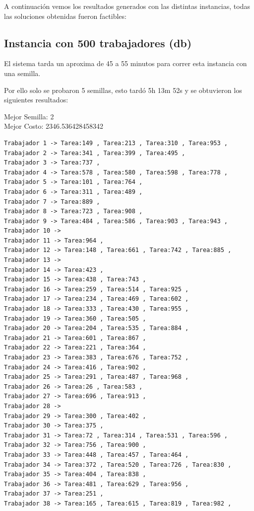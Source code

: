 \documentclass{article}
\begin{document}
A continuación vemos los resultados generados con las distintas instancias, todas las soluciones obtenidas fueron factibles:

\subsection{Instancia con 500 trabajadores (db)}

El sistema tarda un aproxima de 45 a 55 minutos para correr esta instancia con una semilla.

Por ello solo se probaron 5 semillas, esto tardó 5h 13m 52s y se obtuvieron los siguientes resultados:

Mejor Semilla: 2\\
Mejor Costo: 2346.536428458342\\
\begin{lstlisting}
Trabajador 1 -> Tarea:149 , Tarea:213 , Tarea:310 , Tarea:953 , 
Trabajador 2 -> Tarea:341 , Tarea:399 , Tarea:495 , 
Trabajador 3 -> Tarea:737 , 
Trabajador 4 -> Tarea:578 , Tarea:580 , Tarea:598 , Tarea:778 , 
Trabajador 5 -> Tarea:101 , Tarea:764 , 
Trabajador 6 -> Tarea:311 , Tarea:489 , 
Trabajador 7 -> Tarea:889 , 
Trabajador 8 -> Tarea:723 , Tarea:908 , 
Trabajador 9 -> Tarea:484 , Tarea:586 , Tarea:903 , Tarea:943 , 
Trabajador 10 -> 
Trabajador 11 -> Tarea:964 , 
Trabajador 12 -> Tarea:148 , Tarea:661 , Tarea:742 , Tarea:885 , 
Trabajador 13 -> 
Trabajador 14 -> Tarea:423 , 
Trabajador 15 -> Tarea:438 , Tarea:743 , 
Trabajador 16 -> Tarea:259 , Tarea:514 , Tarea:925 , 
Trabajador 17 -> Tarea:234 , Tarea:469 , Tarea:602 , 
Trabajador 18 -> Tarea:333 , Tarea:430 , Tarea:955 , 
Trabajador 19 -> Tarea:360 , Tarea:505 , 
Trabajador 20 -> Tarea:204 , Tarea:535 , Tarea:884 , 
Trabajador 21 -> Tarea:601 , Tarea:867 , 
Trabajador 22 -> Tarea:221 , Tarea:364 , 
Trabajador 23 -> Tarea:383 , Tarea:676 , Tarea:752 , 
Trabajador 24 -> Tarea:416 , Tarea:902 , 
Trabajador 25 -> Tarea:291 , Tarea:487 , Tarea:968 , 
Trabajador 26 -> Tarea:26 , Tarea:583 , 
Trabajador 27 -> Tarea:696 , Tarea:913 , 
Trabajador 28 -> 
Trabajador 29 -> Tarea:300 , Tarea:402 , 
Trabajador 30 -> Tarea:375 , 
Trabajador 31 -> Tarea:72 , Tarea:314 , Tarea:531 , Tarea:596 , 
Trabajador 32 -> Tarea:756 , Tarea:900 , 
Trabajador 33 -> Tarea:448 , Tarea:457 , Tarea:464 , 
Trabajador 34 -> Tarea:372 , Tarea:520 , Tarea:726 , Tarea:830 , 
Trabajador 35 -> Tarea:404 , Tarea:838 , 
Trabajador 36 -> Tarea:481 , Tarea:629 , Tarea:956 , 
Trabajador 37 -> Tarea:251 , 
Trabajador 38 -> Tarea:165 , Tarea:615 , Tarea:819 , Tarea:982 , 

\end{lstlisting}
\end{document}
